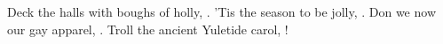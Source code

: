 \documentclass{happyholidays}
\begin{document}

\begin{carol}
Deck the halls with boughs of holly, \eol
\Falala. \eol
'Tis the season to be jolly, \eol
\Falala. \eol
Don we now our gay apparel, \eol
\Falala. \eol
Troll the ancient Yuletide carol, \eol
\Falala! \eol
\end{carol}

\illustration
\end{document}

